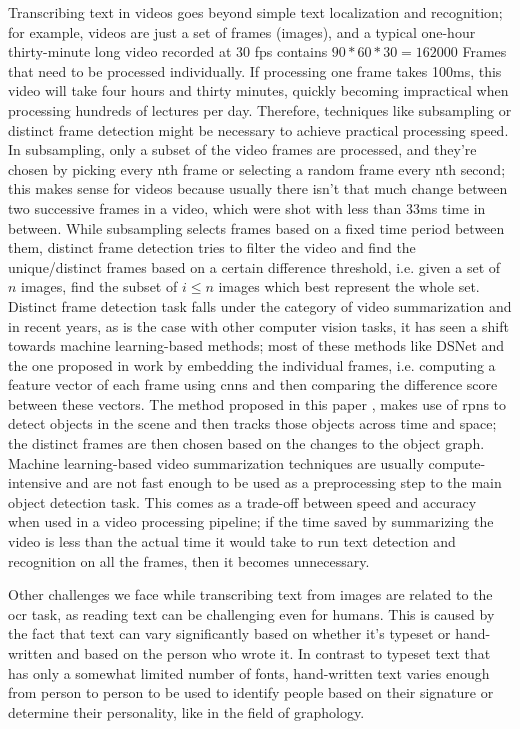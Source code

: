 Transcribing text in videos goes beyond simple text localization and recognition; for example, videos are just a set of frames (images), and a typical one-hour thirty-minute long video recorded at 30 \gls{fps} contains $90 * 60 * 30 = 162000$ Frames that need to be processed individually. If processing one frame takes 100ms, this video will take four hours and thirty minutes, quickly becoming impractical when processing hundreds of lectures per day. Therefore, techniques like subsampling or distinct frame detection might be necessary to achieve practical processing speed. In subsampling, only a subset of the video frames are processed, and they're chosen by picking every nth frame or selecting a random frame every nth second; this makes sense for videos because usually there isn't that much change between two successive frames in a video, which were shot with less than 33ms time in between. While subsampling selects frames based on a fixed time period between them, distinct frame detection tries to filter the video and find the unique/distinct frames based on a certain difference threshold, i.e. given a set of $n$ images, find the subset of $i \leq n $ images which best represent the whole set. Distinct frame detection task falls under the category of video summarization and in recent years, as is the case with other computer vision tasks, it has seen a shift towards machine learning-based methods; most of these methods like DSNet \cite{zhu_dsnet_2021} and the one proposed in \cite{apostolidis_combining_2021} work by embedding the individual frames, i.e. computing a feature vector of each frame using \gls{cnn}s and then comparing the difference score between these vectors. The method proposed in this paper \cite{zhu_relational_2022}, makes use of \gls{rpn}s to detect objects in the scene and then tracks those objects across time and space; the distinct frames are then chosen based on the changes to the object graph. Machine learning-based video summarization techniques are usually compute-intensive and are not fast enough to be used as a preprocessing step to the main object detection task. This comes as a trade-off between speed and accuracy when used in a video processing pipeline; if the time saved by summarizing the video is less than the actual time it would take to run text detection and recognition on all the frames, then it becomes unnecessary. 

Other challenges we face while transcribing text from images are related to the \gls{ocr} task, as reading text can be challenging even for humans. This is caused by the fact that text can vary significantly based on whether it's typeset or hand-written and based on the person who wrote it. In contrast to typeset text that has only a somewhat limited number of fonts, hand-written text varies enough from person to person to be used to identify people based on their signature or determine their personality, like in the field of graphology.

